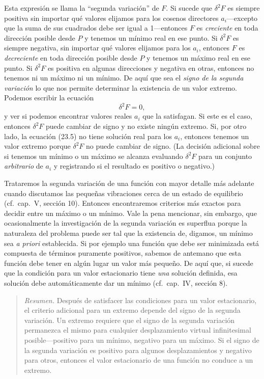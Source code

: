 \documentclass[12pt,a4paper]{book}
\begin{document}
Esta expresión se llama la ``segunda variación'' de $F$. Si sucede que $\delta^2 F$ es siempre positiva sin importar qué valores elijamos para los cosenos directores $a_i$---excepto que la suma de sus cuadrados debe ser igual a 1---entonces $F$ es \textit{creciente} en toda dirección posible desde $P$ y tenemos un mínimo real en ese punto. Si $\delta^2 F$ es siempre negativa, sin importar qué valores elijamos para los $a_i$, entonces $F$ es \textit{decreciente} en toda dirección posible desde $P$ y tenemos un máximo real en ese punto. Si $\delta^2 F$ es positiva en algunas direcciones y negativa en otras, entonces no tenemos ni un máximo ni un mínimo. De aquí que sea el \textit{signo de la segunda variación} lo que nos permite determinar la existencia de un valor extremo. Podemos escribir la ecuación
\begin{equation}
\delta^2 F = 0, \tag{23.5}
\end{equation}
y ver si podemos encontrar valores reales $a_i$ que la satisfagan. Si este es el caso, entonces $\delta^2 F$ puede cambiar de signo y no existe ningún extremo. Si, por otro lado, la ecuación (23.5) no tiene solución real para los $a_i$, entonces tenemos un valor extremo porque $\delta^2 F$ no puede cambiar de signo. (La decisión adicional sobre si tenemos un mínimo o un máximo se alcanza evaluando $\delta^2 F$ para un conjunto \textit{arbitrario} de $a_i$ y registrando si el resultado es positivo o negativo.)

Trataremos la segunda variación de una función con mayor detalle más adelante cuando discutamos las pequeñas vibraciones cerca de un estado de equilibrio (cf.\ cap.\ V, sección 10). Entonces encontraremos criterios más exactos para decidir entre un máximo o un mínimo. Vale la pena mencionar, sin embargo, que ocasionalmente la investigación de la segunda variación es superflua porque la naturaleza del problema puede ser tal que la existencia de, digamos, un mínimo sea \textit{a priori} establecida. Si por ejemplo una función que debe ser minimizada está compuesta de términos puramente positivos, sabemos de antemano que esta función debe tener en algún lugar un valor más pequeño. De aquí que, si sucede que la condición para un valor estacionario tiene \textit{una} solución definida, esa solución debe automáticamente dar un mínimo (cf.\ cap.\ IV, sección 8).

\begin{quote}
\textit{Resumen.} Después de satisfacer las condiciones para un valor estacionario, el criterio adicional para un extremo depende del signo de la segunda variación. Un extremo requiere que el signo de la segunda variación permanezca el mismo para cualquier desplazamiento virtual infinitesimal posible---positivo para un mínimo, negativo para un máximo. Si el signo de la segunda variación es positivo para algunos desplazamientos y negativo para otros, entonces el valor estacionario de una función no conduce a un extremo.
\end{quote}
\end{document}
